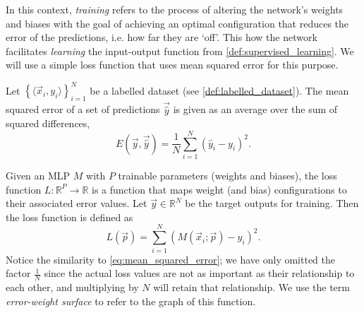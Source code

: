 In this context, \textit{training} refers to the process of altering the network's weights and biases with the goal of achieving an optimal configuration that reduces the error of the predictions, i.e. how far they are `off'. 
This how the network facilitates \textit{learning} the input-output function from \ref{def:supervised_learning}.
We will use a simple loss function that uses mean squared error for this purpose.
\begin{definition}
    \label{def:mean_squared_error}
    Let $\left\{\langle \vec{x}_i, y_i \rangle \right\}_{i=1}^N$ be a labelled dataset (see \ref{def:labelled_dataset}).
    The mean squared error of a set of predictions $\vec{\hat{y}}$ is given as an average over the sum of squared differences,
    \begin{equation}
        \label{eq:mean_squared_error}
        E\left( \vec{y}, \vec{\hat{y}} \right) = \frac{1}{N} \sum_{i=1}^N{\left(\hat{y}_i - y_i\right)^2}.
    \end{equation}
\end{definition}

\begin{definition}
    \label{def:loss_function}
    Given an MLP $M$ with $P$ trainable parameters (weights and biases), the loss function $L:\mathbb{R}^P\rightarrow \mathbb{R}$ is a function that maps weight (and bias) configurations to their associated error values.
    Let $\vec{y} \in \mathbb{R}^N$ be the target outputs for training.
    Then the loss function is defined as
    \begin{equation}
        \label{eq:loss_function}
        L(\vec{p}) = \sum_{i=1}^N{\left(M\left(\vec{x}_i; \vec{p}\right) - y_i\right)^2}.
    \end{equation}
    Notice the similarity to \ref{eq:mean_squared_error}; we have only omitted the factor $\frac{1}{N}$ since the actual loss values are not as important as their relationship to each other, and multiplying by $N$ will retain that relationship.
    We use the term \textit{error-weight surface} to refer to the graph of this function.
\end{definition}

